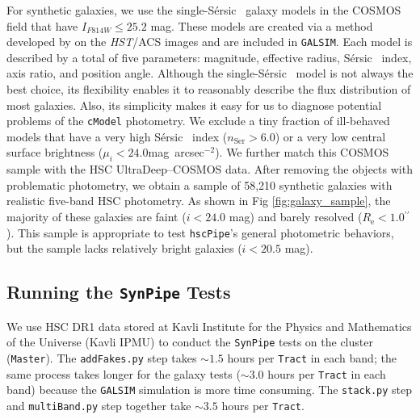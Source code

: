 \documentclass[useamsfonts]{pasj01}
\def\asec{$^{\prime\prime}$}
\def\sb{mag~arcsec$^{-2}$}
\def\ser{{S\'{e}rsic\ }}
\def\hscpipe{\texttt{hscPipe}}
\def\synpipe{\texttt{SynPipe}}
\def\cmodel{\texttt{cModel}}
\def\tract{\texttt{Tract}}
\def\galsim{\texttt{G}{\scriptsize \texttt{AL}}\texttt{S}{\scriptsize \texttt{IM}}}
\begin{document}
For synthetic galaxies, we use the single-\ser{} galaxy models 
    in the COSMOS field that have $I_{F814W} \leq 25.2$ mag.
    These models are created via a method developed by \citet{Lackner2012} on the
    \textit{HST}/ACS images and are included in \galsim{}.
    Each model is described by a total of five parameters: magnitude, effective radius,
    \ser{} index, axis ratio, and position angle.
    Although the single-\ser{} model is not always the best choice, its flexibility
    enables it to reasonably describe the flux distribution of most galaxies.
    Also, its simplicity makes it easy for us to diagnose potential problems of the
    \cmodel{} photometry.
    We exclude a tiny fraction of ill-behaved models that have a very high \ser{}
    index ($n_{\mathrm{Ser}} > 6.0$) or a very low central surface brightness
    ($\mu_{i} < 24.0$\sb).
    We further match this COSMOS sample with the HSC UltraDeep--COSMOS data.
    After removing the objects with problematic photometry, we obtain a sample of
    58,210 synthetic galaxies with realistic five-band HSC photometry.
    As shown in Fig \ref{fig:galaxy_sample}, the majority of these galaxies are
    faint ($i<24.0$ mag) and barely resolved ($R_{\mathrm{e}}< 1.0$\asec).
    This sample is appropriate to test  \hscpipe{}'s general photometric behaviors, but the sample lacks relatively bright galaxies ($i<20.5$ mag).



\subsection{Running the \synpipe{} Tests}
    \label{ssec:running}

    We use HSC DR1 data stored at Kavli Institute for the Physics and Mathematics of the Universe (Kavli IPMU) to conduct the \synpipe{} tests on the cluster (\texttt{Master}).
    The \texttt{addFakes.py} step takes ${\sim}1.5$ hours per \tract{} in each
    band; the same process takes longer for the galaxy tests (${\sim}3.0$ hours per
    \tract{} in each band) because the \galsim{} simulation is more time consuming.
    The \texttt{stack.py} step and \texttt{multiBand.py} step together take ${\sim}3.5$ hours
    per \tract{}.
\end{document}

